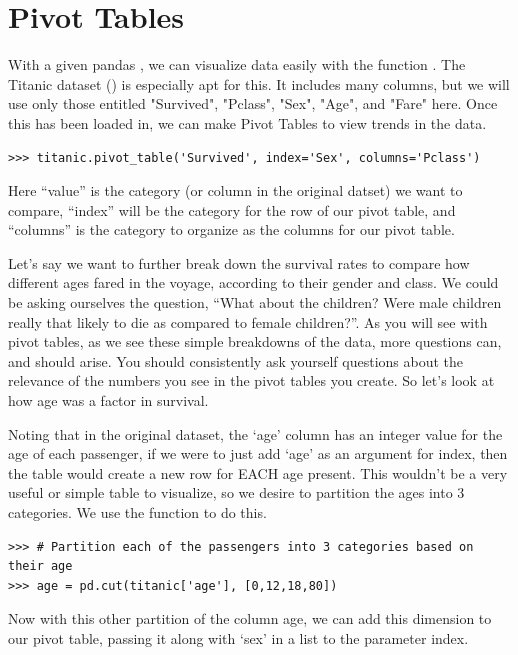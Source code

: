 \section*{Pivot Tables}
With a given pandas , we can visualize data easily with the function . The Titanic dataset () is especially apt for this.  It includes many columns, but we will use only those entitled "Survived", "Pclass", "Sex", "Age", and "Fare" here.  Once this has been loaded in, we can make Pivot Tables to view trends in the data.

\begin{lstlisting}
>>> titanic.pivot_table('Survived', index='Sex', columns='Pclass')
\end{lstlisting}

Here ``value'' is the category (or column in the original datset) we want to compare, ``index'' will be the category for the row of our pivot table, and ``columns'' is the category to organize as the columns for our pivot table.

Let's say we want to further break down the survival rates to compare how different ages fared in the voyage, according to their gender and class. We could be asking ourselves the question, ``What about the children? Were male children really that likely to die as compared to female children?''. As you will see with pivot tables, as we see these simple breakdowns of the data, more questions can, and should arise. You should consistently ask yourself questions about the relevance of the numbers you see in the pivot tables you create. So let's look at how age was a factor in survival.

Noting that in the original dataset, the `age' column has an integer value for the age of each passenger, if we were to just add `age' as an argument for index, then the table would create a new row for EACH age present. This wouldn't be a very useful or simple table to visualize, so we desire to partition the ages into 3 categories. We use the function  to do this.

\begin{lstlisting}
>>> # Partition each of the passengers into 3 categories based on their age
>>> age = pd.cut(titanic['age'], [0,12,18,80])
\end{lstlisting}

Now with this other partition of the column age, we can add this dimension to our pivot table, passing it along with `sex' in a list to the parameter index.

